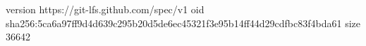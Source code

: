 version https://git-lfs.github.com/spec/v1
oid sha256:5ca6a97ff9d4d639c295b20d5de6ec45321f3e95b14ff44d29cdfbc83f4bda61
size 36642
